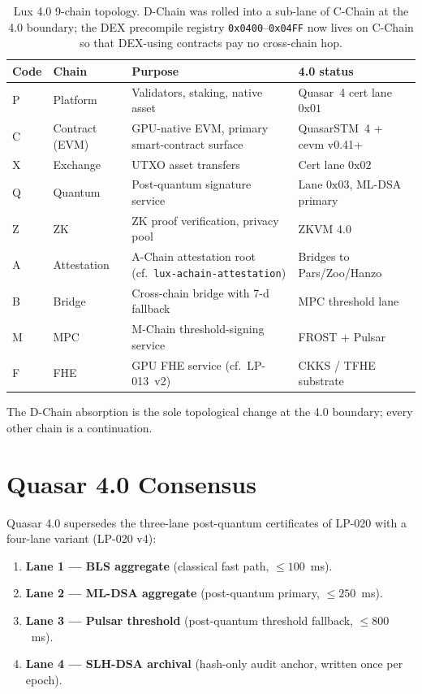 \documentclass[11pt,a4paper]{article}
\begin{document}
\begin{table}[H]
\centering
\small
\begin{tabularx}{\textwidth}{llXl}
\toprule
\textbf{Code} & \textbf{Chain} & \textbf{Purpose} & \textbf{4.0 status} \\
\midrule
P & Platform & Validators, staking, native asset & Quasar~4 cert lane $0\text{x01}$ \\
C & Contract (EVM) & GPU-native EVM, primary smart-contract surface & QuasarSTM~4 + cevm v0.41+ \\
X & Exchange & UTXO asset transfers & Cert lane $0\text{x02}$ \\
Q & Quantum & Post-quantum signature service & Lane $0\text{x03}$, ML-DSA primary \\
Z & ZK & ZK proof verification, privacy pool & ZKVM 4.0 \\
A & Attestation & A-Chain attestation root (cf.\ \texttt{lux-achain-attestation}) & Bridges to Pars/Zoo/Hanzo \\
B & Bridge & Cross-chain bridge with 7-d fallback & MPC threshold lane \\
M & MPC & M-Chain threshold-signing service & FROST + Pulsar \\
F & FHE & GPU FHE service (cf.\ LP-013~v2) & CKKS / TFHE substrate \\
\bottomrule
\end{tabularx}
\caption{Lux 4.0 9-chain topology. D-Chain was rolled into a
sub-lane of C-Chain at the 4.0 boundary; the DEX precompile registry
\texttt{0x0400}--\texttt{0x04FF} now lives on C-Chain so that DEX-using
contracts pay no cross-chain hop.}
\end{table}

The D-Chain absorption is the sole topological change at the 4.0
boundary; every other chain is a continuation.

\section{Quasar 4.0 Consensus}
\label{sec:quasar4}

Quasar 4.0 supersedes the three-lane post-quantum certificates of
LP-020 with a four-lane variant (LP-020 v4):

\begin{enumerate}[leftmargin=*]
\item \textbf{Lane 1 --- BLS aggregate} (classical fast path, $\le 100$~ms).
\item \textbf{Lane 2 --- ML-DSA aggregate} (post-quantum primary,
$\le 250$~ms).
\item \textbf{Lane 3 --- Pulsar threshold} (post-quantum threshold
fallback, $\le 800$~ms).
\item \textbf{Lane 4 --- SLH-DSA archival} (hash-only audit anchor,
written once per epoch).
\end{enumerate}
\end{document}
